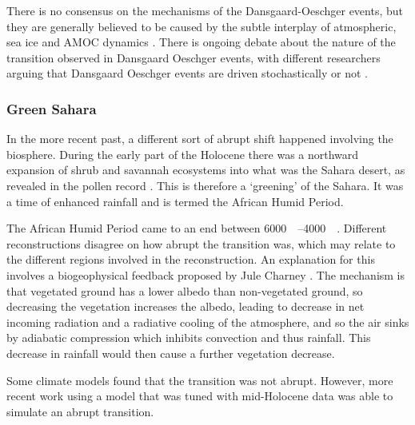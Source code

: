 There is no consensus on the mechanisms of the Dansgaard-Oeschger events, but they are generally believed to be caused by the subtle interplay of atmospheric, sea ice and AMOC dynamics
\parencite{Vettoretti2022,Boers2018,Riechers2023arxiv}. There is ongoing debate about the nature of the transition observed in Dansgaard Oeschger events, with different researchers arguing
that Dansgaard Oeschger events are driven stochastically \parencite{Ditlevsen2010,Ditlevsen1999} or not \parencite{Boers2018a}.

\subsubsection{Green Sahara}
In the more recent past, a different sort of abrupt shift happened involving the biosphere. During the early part of the Holocene there was a northward expansion of shrub and savannah ecosystems
into what was the Sahara desert, as revealed in the pollen record \parencite{Hoelzmann1998,Hely2014}. This is therefore a `greening' of the Sahara. It was a time of enhanced rainfall \parencite{Tierney2017}
and is termed the African Humid Period.

The African Humid Period came to an end between \SIrange{6000}{4000}{\year\beforepresent}. Different reconstructions \parencite{Shanahan2015,Kropelin2008} disagree on how abrupt the transition
was, which may relate to the different regions involved in the reconstruction. An explanation for this 
involves a biogeophysical feedback proposed by Jule Charney \parencite{Charney1975,Charney1975a}. The mechanism is that vegetated ground has a lower
albedo than non-vegetated ground, so decreasing the vegetation increases the albedo, leading to decrease in net incoming radiation and a radiative cooling of the atmosphere, and so the air sinks by adiabatic compression
which inhibits convection and thus rainfall. This decrease in rainfall would then cause a further vegetation decrease.

Some climate models \parencite{Renssen2006} found that the transition was not abrupt. However, more recent work \parencite{Hopcroft2021} using a model that was tuned with mid-Holocene data was able to simulate an abrupt
transition.

